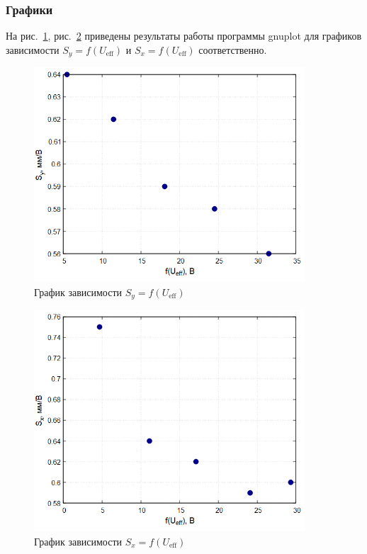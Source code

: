 \subsubsection{Графики}

На рис.~\ref{fig:plot1}, рис.~\ref{fig:plot2} приведены результаты работы программы gnuplot для графиков зависимости $S_y = f(U_{\text{eff}})$ и $S_x = f(U_{\text{eff}})$ соответственно.

\begin{figure}[H]
\centering
\includegraphics[width=0.9\textwidth]{plot1.png}
\caption{График зависимости $S_y = f(U_{\text{eff}})$}
\label{fig:plot1}
\end{figure}

\begin{figure}[H]
\centering
\includegraphics[width=0.9\textwidth]{plot2.png}
\caption{График зависимости $S_x = f(U_{\text{eff}})$}
\label{fig:plot2}
\end{figure}

